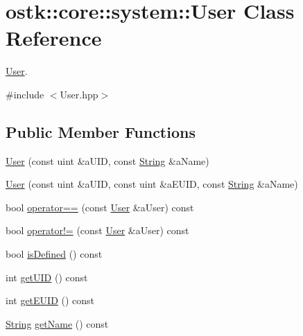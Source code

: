\hypertarget{classostk_1_1core_1_1system_1_1_user}{}\section{ostk\+:\+:core\+:\+:system\+:\+:User Class Reference}
\label{classostk_1_1core_1_1system_1_1_user}


\hyperlink{classostk_1_1core_1_1system_1_1_user}{User}.  




{\ttfamily \#include $<$User.\+hpp$>$}

\subsection*{Public Member Functions}
\begin{DoxyCompactItemize}
\item 
\hyperlink{classostk_1_1core_1_1system_1_1_user_a0de9691c8ea414402a61ca2ba571125b}{User} (const uint \&a\+U\+ID, const \hyperlink{classostk_1_1core_1_1types_1_1_string}{String} \&a\+Name)
\item 
\hyperlink{classostk_1_1core_1_1system_1_1_user_a136687a5b8b44617158bb3d14d4697c8}{User} (const uint \&a\+U\+ID, const uint \&a\+E\+U\+ID, const \hyperlink{classostk_1_1core_1_1types_1_1_string}{String} \&a\+Name)
\item 
bool \hyperlink{classostk_1_1core_1_1system_1_1_user_a58e11432b4f5e0c37edf841d3360f58b}{operator==} (const \hyperlink{classostk_1_1core_1_1system_1_1_user}{User} \&a\+User) const
\item 
bool \hyperlink{classostk_1_1core_1_1system_1_1_user_ac11fea5211b9e8faa2ae07c1ba5fa154}{operator!=} (const \hyperlink{classostk_1_1core_1_1system_1_1_user}{User} \&a\+User) const
\item 
bool \hyperlink{classostk_1_1core_1_1system_1_1_user_a8db1aaed91e6eca5459230cd28931e56}{is\+Defined} () const
\item 
int \hyperlink{classostk_1_1core_1_1system_1_1_user_acc8330f48805da8a188c0b38ef815a03}{get\+U\+ID} () const
\item 
int \hyperlink{classostk_1_1core_1_1system_1_1_user_ac4c9c03e93d714ccf43b6160c73e9604}{get\+E\+U\+ID} () const
\item 
\hyperlink{classostk_1_1core_1_1types_1_1_string}{String} \hyperlink{classostk_1_1core_1_1system_1_1_user_a1f112f97f90b2910c943d22aff6f66f5}{get\+Name} () const
\end{DoxyCompactItemize}
